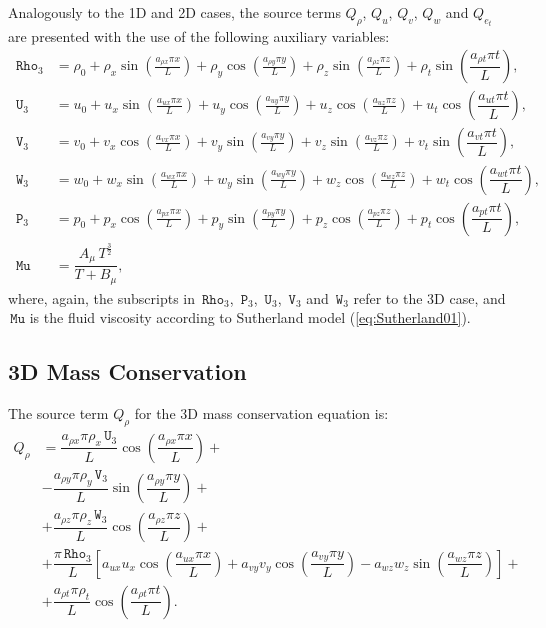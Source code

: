 \documentclass[10pt]{article}
\newcommand{\Rho}{\,\mathtt{Rho}}
\newcommand{\PP}{\,\mathtt{P}}
\newcommand{\U}{\,\mathtt{U}}
\newcommand{\V}{\,\mathtt{V}}
\newcommand{\W}{\,\mathtt{W}}
\newcommand{\MU}{\,\mathtt{Mu}}
\begin{document}
Analogously to the 1D and 2D cases, the source terms $Q_\rho$, $Q_u$, $Q_v$, $Q_w$ and $Q_{e_t}$ are  presented with the use of the following auxiliary variables:
\begin{equation*}
 \begin{split}
\label{eq:aux}
\Rho_3 &= \rho_{0}+ \rho_{x} \sin\left(\frac{a_{ \rho  x} \pi x}{L}\right)+ \rho_{y} \cos\left(\frac{a_{ \rho  y} \pi y}{L}\right) + \rho_{z} \sin\left(\frac{a_{ \rho  z} \pi z}{L}\right)+ \rho_t \sin\left(\dfrac{a_{\rho t} \pi t}{L}\right),\\
\U_3 &=u_{0}+u_{x} \sin\left(\frac{a_{u  x} \pi x}{L}\right)+u_{y} \cos\left(\frac{a_{u  y} \pi y}{L}\right)+u_{z} \cos\left(\frac{a_{u  z} \pi z}{L}\right) + u_t \cos\left(\dfrac{a_{u t} \pi t}{L}\right) ,\\
\V_3 &= v_{0}+v_{x} \cos\left(\frac{a_{v  x} \pi x}{L}\right)+v_{y} \sin\left(\frac{a_{v  y} \pi y}{L}\right)+v_{z} \sin\left(\frac{a_{v  z} \pi z}{L}\right)+ v_t \sin\left(\dfrac{a_{v t} \pi t}{L}\right), \\
\W_3 &= w_{0}+w_{x} \sin\left(\frac{a_{w  x} \pi x}{L}\right)+w_{y} \sin\left(\frac{a_{w  y} \pi y}{L}\right)+ w_{z} \cos\left(\frac{a_{w  z} \pi z}{L}\right) + w_t \cos\left(\dfrac{a_{w t} \pi t}{L}\right),\\
\PP_3 &= p_{0}+p_{x} \cos\left(\frac{a_{p  x} \pi x}{L}\right)+p_{y} \sin\left(\frac{a_{p  y} \pi y}{L}\right)+ p_{z} \cos\left(\frac{a_{p  z} \pi z}{L}\right)+ p_t \cos\left(\dfrac{a_{p t} \pi t}{L}\right),\\
\MU  &=\dfrac{A_\mu \, T^{\frac{3}{2}}}{T+B_\mu},
\end{split}
\end{equation*}
where, again, the subscripts in $\Rho_3$, $\PP_3$, $\U_3$, $\V_3$ and $\W_3$ refer to the 3D case, and $\MU$ is the fluid viscosity according to Sutherland model (\ref{eq:Sutherland01}).

\subsection{3D Mass Conservation}

The source term $Q_{\rho}$ for the 3D mass conservation equation is:
\begin{equation}
 \begin{split}
Q_\rho &=\dfrac{ a_{\rho x} \pi \rho_x \U_3}{L} \cos\left(\dfrac{a_{\rho x} \pi x}{L}\right)+\\
&-\dfrac{a_{\rho y} \pi \rho_y \V_3 }{L}\sin\left(\dfrac{a_{\rho y} \pi y}{L}\right)+\\
&+\dfrac{a_{\rho z} \pi \rho_z \W_3 }{L}\cos\left(\dfrac{a_{\rho z}\pi z }{L}\right)+\\
&+\dfrac{\pi \Rho_3}{L}\left[a_{ux} u_x \cos\left(\dfrac{a_{ux} \pi x}{L}\right)+a_{vy} v_y \cos\left(\dfrac{a_{vy} \pi y}{L}\right)-a_{wz} w_z \sin\left(\dfrac{a_{wz}\pi z }{L}\right)\right]+\\
&+\dfrac{a_{\rho t} \pi \rho_t }{L}\cos\left(\dfrac{a_{\rho t} \pi t}{L}\right).
 \end{split}
\end{equation}
\end{document}
